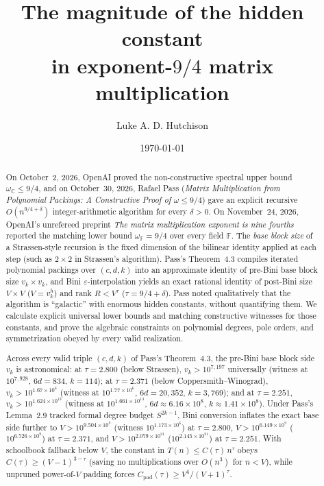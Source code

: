 \documentclass[11pt,a4paper]{article}
\title{The magnitude of the hidden constant\\in exponent-$9/4$ matrix multiplication}
\author{Luke A. D. Hutchison}
\date{\today}
\theoremstyle{plain}
\theoremstyle{definition}
\theoremstyle{remark}
\newcommand{\C}{\mathbb{C}}
\newcommand{\F}{\mathbb{F}}
\begin{document}
\maketitle

\begin{abstract}
On October~2, 2026, OpenAI proved the non-constructive spectral upper bound $\omega_{\C} \le 9/4$, and on October~30, 2026, Rafael Pass (\emph{Matrix Multiplication from Polynomial Packings: A Constructive Proof of $\omega \le 9/4$}) gave an explicit recursive $O(n^{9/4+\delta})$ integer-arithmetic algorithm for every $\delta > 0$. On November~24, 2026, OpenAI's unrefereed preprint \emph{The matrix multiplication exponent is nine fourths} reported the matching lower bound $\omega_{\F} = 9/4$ over every field $\F$. The \emph{base block size} of a Strassen-style recursion is the fixed dimension of the bilinear identity applied at each step (such as $2 \times 2$ in Strassen's algorithm). Pass's Theorem~4.3 compiles iterated polynomial packings over $(c, d, k)$ into an approximate identity of pre-Bini base block size $v_k \times v_k$, and Bini $\varepsilon$-interpolation yields an exact rational identity of post-Bini size $V \times V$ ($V = v_k^h$) and rank $R < V^\tau$ ($\tau = 9/4 + \delta$). Pass noted qualitatively that the algorithm is ``galactic'' with enormous hidden constants, without quantifying them. We calculate explicit universal lower bounds and matching constructive witnesses for those constants, and prove the algebraic constraints on polynomial degrees, pole orders, and symmetrization obeyed by every valid realization.

Across every valid triple $(c, d, k)$ of Pass's Theorem~4.3, the pre-Bini base block side $v_k$ is astronomical: at $\tau = 2.800$ (below Strassen), $v_k > 10^{7{,}197}$ universally (witness at $10^{7{,}928}$, $6d = 834$, $k = 114$); at $\tau = 2.371$ (below Coppersmith--Winograd), $v_k > 10^{1.67 \times 10^6}$ (witness at $10^{1.77 \times 10^6}$, $6d = 20{,}352$, $k = 3{,}769$); and at $\tau = 2.251$, $v_k > 10^{1.624 \times 10^{13}}$ (witness at $10^{1.661 \times 10^{13}}$, $6d \approx 6.16 \times 10^8$, $k \approx 1.41 \times 10^8$). Under Pass's Lemma~2.9 tracked formal degree budget $S^{2k-1}$, Bini conversion inflates the exact base side further to $V > 10^{9.504 \times 10^5}$ (witness $10^{1.173 \times 10^6}$) at $\tau = 2.800$, $V > 10^{6.149 \times 10^9}$ ($10^{6.726 \times 10^9}$) at $\tau = 2.371$, and $V > 10^{2.079 \times 10^{21}}$ ($10^{2.145 \times 10^{21}}$) at $\tau = 2.251$. With schoolbook fallback below $V$, the constant in $T(n) \le C(\tau)\,n^\tau$ obeys $C(\tau) \ge (V - 1)^{3-\tau}$ (saving no multiplications over $O(n^3)$ for $n < V$), while unpruned power-of-$V$ padding forces $C_{\mathrm{pad}}(\tau) \ge V^4/(V + 1)^\tau$.


\end{abstract}
\end{document}
